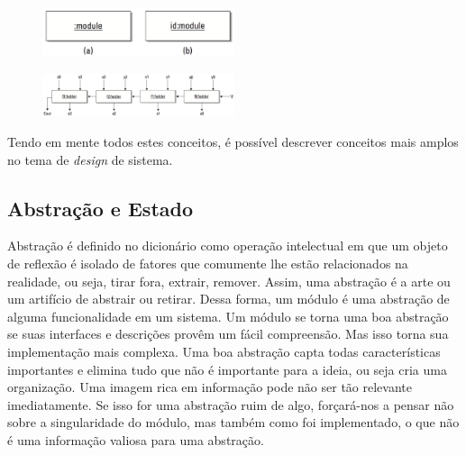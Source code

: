 \begin{figure}[H] \centering

	\includegraphics[width=0.5\textwidth]{img/f3-2.png}

	\caption{}

	\label{fig:f3-2}

\end{figure}



\begin{figure}[H] \centering

	\includegraphics[width=0.5\textwidth]{img/f3-3.png}

	\caption{}

	\label{fig:f3-3}

\end{figure}



Tendo em mente todos estes conceitos, é possível descrever conceitos mais amplos no tema de \textit{design} de sistema.





\subsection{Abstração e Estado}



Abstração é definido no dicionário como operação intelectual em que um objeto de reflexão é isolado de fatores que comumente lhe estão relacionados na realidade, ou seja, tirar fora, extrair, remover. Assim, uma abstração é a arte ou um artifício de abstrair ou retirar. Dessa forma, um módulo é uma abstração de alguma funcionalidade em um sistema. Um módulo se torna uma boa abstração se suas interfaces e descrições provêm um fácil compreensão. Mas isso torna sua implementação mais complexa. Uma boa abstração capta todas características importantes e elimina tudo que não é importante para a ideia, ou seja cria uma organização. Uma imagem rica em informação pode não ser tão relevante imediatamente. Se isso for uma abstração ruim de algo, forçará-nos a pensar não sobre a singularidade do módulo, mas também como foi implementado, o que não é uma informação valiosa para uma abstração.

